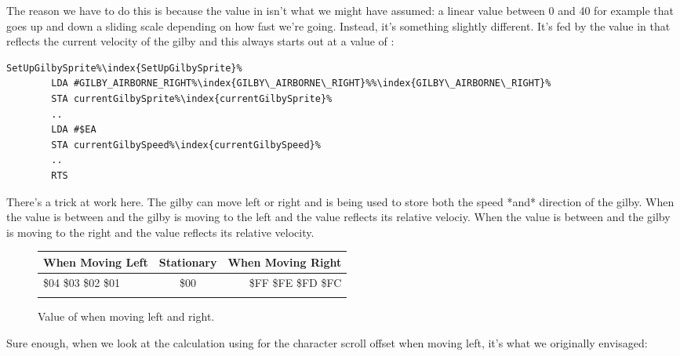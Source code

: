 The reason we have to do this is because the value in  isn't what we might have
assumed: a linear value between 0 and 40 for example that goes up and down a sliding scale depending on
how fast we're going. Instead, it's something slightly different. It's fed by the value in 
that reflects the current velocity of the gilby and this always starts out at a value of :

\begin{lstlisting}[escapechar=\%]
SetUpGilbySprite%\index{SetUpGilbySprite}%
        LDA #GILBY_AIRBORNE_RIGHT%\index{GILBY\_AIRBORNE\_RIGHT}%%\index{GILBY\_AIRBORNE\_RIGHT}%
        STA currentGilbySprite%\index{currentGilbySprite}%
        ..
        LDA #$EA
        STA currentGilbySpeed%\index{currentGilbySpeed}%
        ..
        RTS
\end{lstlisting}

There's a trick at work here. The gilby can move left or right and  is being used to
store both the speed *and* direction of the gilby. When the value is between  and  the gilby is moving
to the left and the value reflects its relative velociy. When the value is between  and  the gilby is
moving to the right and the value reflects its relative velocity.


\begin{figure}[H]
  {
    \setlength{\tabcolsep}{3.0pt}
    \setlength\cmidrulewidth{\heavyrulewidth} %
    \begin{adjustbox}{width=8cm,center}

      \begin{tabular}{lcr}
        \toprule
        When Moving Left & Stationary &  When Moving Right    \\
        \midrule
        \$04 \$03 \$02 \$01 & \$00 & \$FF \$FE \$FD \$FC \\
        \addlinespace
        \bottomrule
      \end{tabular}
    \end{adjustbox}
  }\caption{Value of  when moving left and right.}
\end{figure}
\vspace{-0.05cm}

Sure enough, when we look at the calculation using for the character scroll offset when moving left, it's what we
originally envisaged:

